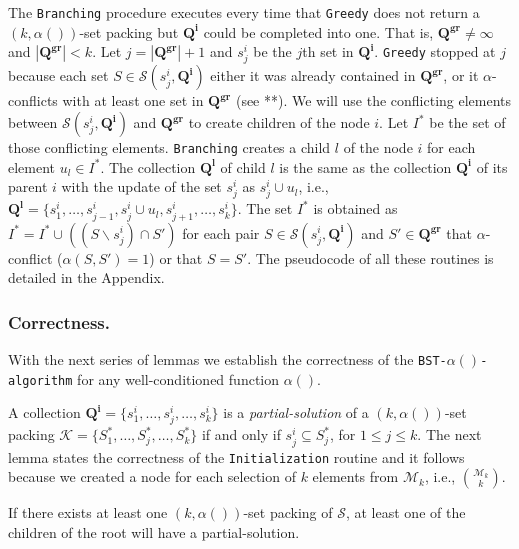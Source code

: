 The \texttt{Branching} procedure executes every time that \texttt{Greedy} does not return a $(k,\alpha())$-set packing but $\mathbf{Q^i}$ could be completed into one. That is, $\mathbf{Q^{gr}} \neq \infty$ and  $|\mathbf{Q^{gr}}|<k$.
Let $j=|\mathbf{Q^{gr}}|+1$ and $s^i_j$ be the $j$th set in $\mathbf{Q^i}$. 
\texttt{Greedy} stopped at $j$ because each set $S \in \mathcal{S}(s^i_j,\mathbf{Q^i})$ either it was already contained in $\mathbf{Q^{gr}}$, or  it $\alpha$-conflicts with at least one set in $\mathbf{Q^{gr}}$ (see **). 
We will use the conflicting elements between $\mathcal{S}(s^i_j,\mathbf{Q^i})$ and $\mathbf{Q^{gr}}$ to create children of the node $i$.
Let $I^*$ be the set of those conflicting elements. 
\texttt{Branching} creates a child $l$ of the node $i$ for each element $u_l \in I^*$. The collection $\mathbf{Q^l}$ of child $l$ is the same as the collection $\mathbf{Q^i}$ of its parent $i$ with the update of the set $s^i_j$ as $s^i_j \cup u_l$, i.e., $\mathbf{Q^l}=\{s^i_1,\dots,s^i_{j-1}, s^i_j \cup u_l, s^i_{j+1},\dots, s^i_{k}\}$. 
The set $I^*$ is obtained as $I^* = I^* \cup ((S \backslash s^i_j) \cap S')$ for each pair $S \in \mathcal{S}(s^i_j,\mathbf{Q^i})$ and $S' \in \mathbf{Q^{gr}}$ that $\alpha$-conflict ($\alpha(S,S')=1$) or that $S=S'$. The pseudocode of all these routines is detailed in the Appendix. 

\subsubsection{Correctness.}

With the next series of lemmas we establish the correctness of the \texttt{BST-$\alpha()$-algorithm} for any well-conditioned function $\alpha()$.


A collection $\mathbf{Q^i}=\{s^i_1,\dots,s^i_j,\dots,s^i_k\}$ is a \emph{partial-solution} of a $(k,\alpha())$-set packing $\mathcal{K}=\{S^*_1,\dots,S^*_j,\dots,S^*_k\}$ if and only if $s^i_j \subseteq S^*_j$, for $1 \leq j \leq k$. The next lemma states the correctness of the \texttt{Initialization} routine and it follows because we created a node for each selection of $k$ elements from $\mathcal{M}_k$, i.e., $\binom{\mathcal{M}_k}{k}$. 

\begin{lemma}\label{InitializationLemma}
If there exists at least one $(k,\alpha())$-set packing of $\mathcal{S}$, at least one of the children of the root will have a partial-solution.
\end{lemma}

